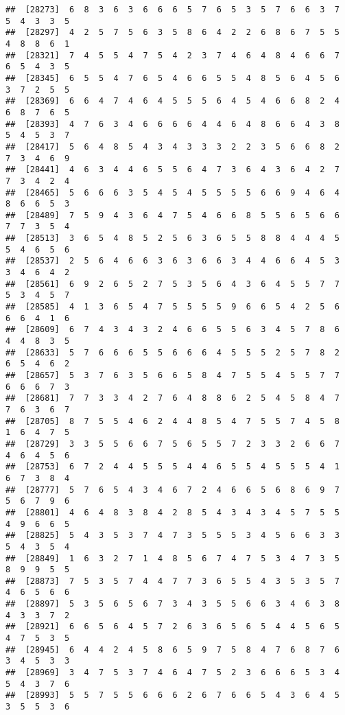 \documentclass[
]{book}
\begin{document}
\begin{verbatim}
##  [28273]  6  8  3  6  3  6  6  6  5  7  6  5  3  5  7  6  6  3  7  5  4  3  3  5
##  [28297]  4  2  5  7  5  6  3  5  8  6  4  2  2  6  8  6  7  5  5  4  8  8  6  1
##  [28321]  7  4  5  5  4  7  5  4  2  3  7  4  6  4  8  4  6  6  7  6  5  4  3  5
##  [28345]  6  5  5  4  7  6  5  4  6  6  5  5  4  8  5  6  4  5  6  3  7  2  5  5
##  [28369]  6  6  4  7  4  6  4  5  5  5  6  4  5  4  6  6  8  2  4  6  8  7  6  5
##  [28393]  4  7  6  3  4  6  6  6  6  4  4  6  4  8  6  6  4  3  8  5  4  5  3  7
##  [28417]  5  6  4  8  5  4  3  4  3  3  3  2  2  3  5  6  6  8  2  7  3  4  6  9
##  [28441]  4  6  3  4  4  6  5  5  6  4  7  3  6  4  3  6  4  2  7  7  3  4  2  4
##  [28465]  5  6  6  6  3  5  4  5  4  5  5  5  5  6  6  9  4  6  4  8  6  6  5  3
##  [28489]  7  5  9  4  3  6  4  7  5  4  6  6  8  5  5  6  5  6  6  7  7  3  5  4
##  [28513]  3  6  5  4  8  5  2  5  6  3  6  5  5  8  8  4  4  4  5  5  4  6  5  6
##  [28537]  2  5  6  4  6  6  3  6  3  6  6  3  4  4  6  6  4  5  3  3  4  6  4  2
##  [28561]  6  9  2  6  5  2  7  5  3  5  6  4  3  6  4  5  5  7  7  5  3  4  5  7
##  [28585]  4  1  3  6  5  4  7  5  5  5  5  9  6  6  5  4  2  5  6  6  6  4  1  6
##  [28609]  6  7  4  3  4  3  2  4  6  6  5  5  6  3  4  5  7  8  6  4  4  8  3  5
##  [28633]  5  7  6  6  6  5  5  6  6  6  4  5  5  5  2  5  7  8  2  6  5  4  6  2
##  [28657]  5  3  7  6  3  5  6  6  5  8  4  7  5  5  4  5  5  7  7  6  6  6  7  3
##  [28681]  7  7  3  3  4  2  7  6  4  8  8  6  2  5  4  5  8  4  7  7  6  3  6  7
##  [28705]  8  7  5  5  4  6  2  4  4  8  5  4  7  5  5  7  4  5  8  1  6  4  7  5
##  [28729]  3  3  5  5  6  6  7  5  6  5  5  7  2  3  3  2  6  6  7  4  6  4  5  6
##  [28753]  6  7  2  4  4  5  5  5  4  4  6  5  5  4  5  5  5  4  1  6  7  3  8  4
##  [28777]  5  7  6  5  4  3  4  6  7  2  4  6  6  5  6  8  6  9  7  5  6  7  9  6
##  [28801]  4  6  4  8  3  8  4  2  8  5  4  3  4  3  4  5  7  5  5  4  9  6  6  5
##  [28825]  5  4  3  5  3  7  4  7  3  5  5  5  3  4  5  6  6  3  3  5  4  3  5  4
##  [28849]  1  6  3  2  7  1  4  8  5  6  7  4  7  5  3  4  7  3  5  8  9  9  5  5
##  [28873]  7  5  3  5  7  4  4  7  7  3  6  5  5  4  3  5  3  5  7  4  6  5  6  6
##  [28897]  5  3  5  6  5  6  7  3  4  3  5  5  6  6  3  4  6  3  8  4  3  3  7  2
##  [28921]  6  6  5  6  4  5  7  2  6  3  6  5  6  5  4  4  5  6  5  4  7  5  3  5
##  [28945]  6  4  4  2  4  5  8  6  5  9  7  5  8  4  7  6  8  7  6  3  4  5  3  3
##  [28969]  3  4  7  5  3  7  4  6  4  7  5  2  3  6  6  6  5  3  4  5  4  3  7  6
##  [28993]  5  5  7  5  5  6  6  6  2  6  7  6  6  5  4  3  6  4  5  3  5  5  3  6

\end{verbatim}
\end{document}
